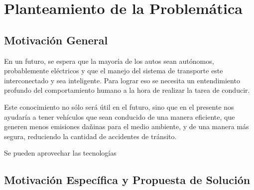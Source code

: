 
\chapter{Planteamiento de la Problemática}  %

\ifpdf
    \graphicspath{{Chapter1/Figs/Raster/}{Chapter1/Figs/PDF/}{Chapter1/Figs/}}
\else
    \graphicspath{{Chapter1/Figs/Vector/}{Chapter1/Figs/}}
\fi


\section{Motivación General}

En un futuro, se espera que la mayoría de los autos sean autónomos, probablemente eléctricos y que el manejo del sistema de transporte este interconectado y sea inteligente. Para lograr eso se necesita un entendimiento profundo del comportamiento humano a la hora de realizar la tarea de conducir.

Este conocimiento no sólo será útil en el futuro, sino que en el presente nos ayudaría a tener vehículos que sean conducido de una manera eficiente, que generen menos emisiones dañinas para el medio ambiente, y de una manera más segura, reduciendo la cantidad de accidentes de tránsito. 

Se pueden aprovechar las tecnologías 



\section{Motivación Específica y Propuesta de Solución}
